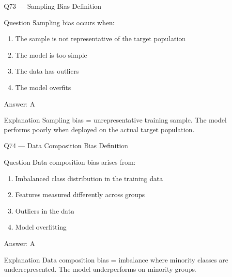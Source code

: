 \documentclass[aspectratio=169,8pt]{beamer}
\begin{document}
	\begin{frame}{Q73 --- Sampling Bias Definition}
		\begin{block}{Question}
			Sampling bias occurs when:
			\begin{enumerate}
				\item The sample is not representative of the target population
				\item The model is too simple
				\item The data has outliers
				\item The model overfits
			\end{enumerate}
		\end{block}
		\begin{exampleblock}{Answer: A}\end{exampleblock}
		\begin{block}{Explanation}
			Sampling bias = unrepresentative training sample. The model performs poorly when deployed on the actual target population.
		\end{block}
	\end{frame}
	
	\begin{frame}{Q74 --- Data Composition Bias Definition}
		\begin{block}{Question}
			Data composition bias arises from:
			\begin{enumerate}
				\item Imbalanced class distribution in the training data
				\item Features measured differently across groups
				\item Outliers in the data
				\item Model overfitting
			\end{enumerate}
		\end{block}
		\begin{exampleblock}{Answer: A}\end{exampleblock}
		\begin{block}{Explanation}
			Data composition bias = imbalance where minority classes are underrepresented. The model underperforms on minority groups.
		\end{block}
	\end{frame}
	
\end{document}
